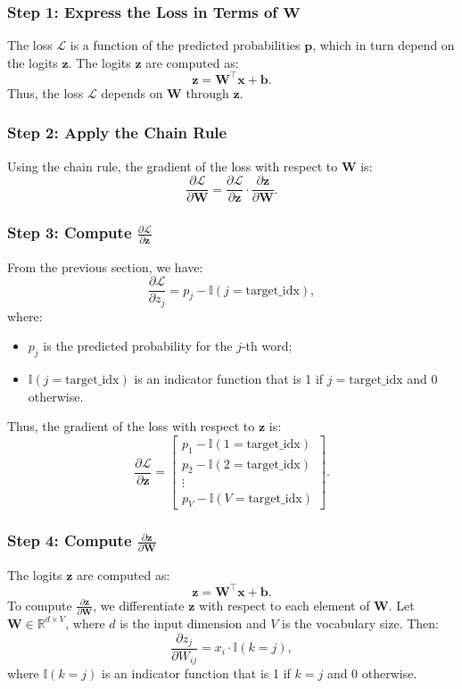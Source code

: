 \begin{notechapter}
\subsubsection{Step 1: Express the Loss in Terms of \(\mathbf{W}\)}
The loss \(\mathcal{L}\) is a function of the predicted probabilities \(\mathbf{p}\),
which in turn depend on the logits \(\mathbf{z}\). The logits \(\mathbf{z}\) are
computed as:
\[
\mathbf{z} = \mathbf{W}^\top \mathbf{x} + \mathbf{b}.
\]
Thus, the loss \(\mathcal{L}\) depends on \(\mathbf{W}\) through \(\mathbf{z}\).

\subsubsection{Step 2: Apply the Chain Rule}
Using the chain rule, the gradient of the loss with respect to \(\mathbf{W}\) is:
\[
\frac{\partial \mathcal{L}}{\partial \mathbf{W}} = 
\frac{\partial \mathcal{L}}{\partial \mathbf{z}} \cdot 
\frac{\partial \mathbf{z}}{\partial \mathbf{W}}.
\]

\subsubsection{Step 3: Compute \(\frac{\partial \mathcal{L}}{\partial \mathbf{z}}\)}
From the previous section, we have:
\[
\frac{\partial \mathcal{L}}{\partial z_j} = p_j - \mathbb{I}(j = \text{target\_idx}),
\]
where:
\begin{itemize}
\item \( p_j \) is the predicted probability for the \( j \)-th word;
\item \( \mathbb{I}(j = \text{target\_idx}) \) is an indicator function that is 1 if
  \( j = \text{target\_idx} \) and 0 otherwise.
\end{itemize}

Thus, the gradient of the loss with respect to \(\mathbf{z}\) is:
\[
\frac{\partial \mathcal{L}}{\partial \mathbf{z}} = 
\begin{bmatrix}
p_1 - \mathbb{I}(1 = \text{target\_idx}) \\
p_2 - \mathbb{I}(2 = \text{target\_idx}) \\
\vdots \\
p_V - \mathbb{I}(V = \text{target\_idx})
\end{bmatrix}.
\]

\subsubsection{Step 4: Compute \(\frac{\partial \mathbf{z}}{\partial \mathbf{W}}\)}
The logits \(\mathbf{z}\) are computed as:
\[
\mathbf{z} = \mathbf{W}^\top \mathbf{x} + \mathbf{b}.
\]
To compute \(\frac{\partial \mathbf{z}}{\partial \mathbf{W}}\),
we differentiate \(\mathbf{z}\) with respect to each element of
\(\mathbf{W}\). Let \(\mathbf{W} \in \mathbb{R}^{d \times V}\),
where \(d\) is the input dimension and \(V\) is the vocabulary size.
Then:
\[
\frac{\partial z_j}{\partial W_{ij}} = x_i \cdot \mathbb{I}(k = j),
\]
where \(\mathbb{I}(k = j)\) is an indicator function that is 1 if
\(k = j\) and 0 otherwise.


\end{notechapter}
